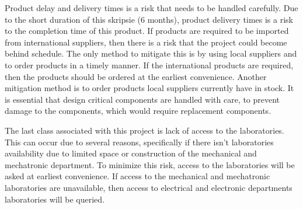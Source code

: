 Product delay and delivery times is a risk that needs to be handled carefully. Due to the short duration of this skripsie (6 months), product delivery times is a risk to the completion time of this product. If products are required to be imported from international suppliers, then there is a risk that the project could become behind schedule. The only method to mitigate this is by using local suppliers and to order products in a timely manner. If the international products are required, then the products should be ordered at the earliest convenience.  Another mitigation method is to order products local suppliers currently have in stock. It is essential that design critical components are handled with care, to prevent damage to the components, which would require replacement components.


The last class associated with this project is lack of access to the laboratories. This can occur due to several reasons, specifically if there isn't laboratories availability due to limited space or construction of the mechanical and mechatronic department. To minimize this risk, access to the laboratories will be asked at earliest convenience. If access to the mechanical and mechatronic laboratories are unavailable, then access to electrical and electronic departments laboratories will be queried.


